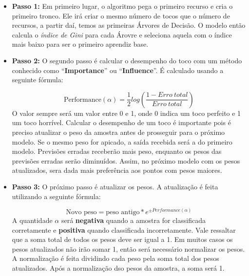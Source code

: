 \documentclass[
  letterpaper,
  DIV=11,
  numbers=noendperiod]{scrreprt}
\begin{document}
\begin{itemize}
\item
  \textbf{Passo 1:} Em primeiro lugar, o algoritmo pega o primeiro
  recurso e cria o primeiro tronco. Ele irá criar o mesmo número de
  tocos que o número de recursos, a partir daí, temos as primeiras
  Árvores de Decisão. O modelo então calcula o \emph{índice de Gini}
  para cada Árovre e seleciona aquela com o índice mais baixo para ser o
  primeiro aprendiz base.
\item
  \textbf{Passo 2:} O segundo passo é calcular o desempenho do toco com
  um método conhecido como ``\textbf{Importance}'' ou
  ``\textbf{Influence}''. É calculado usando a seguinte fórmula:

  \[
  \mbox{Performance} (\alpha) = \frac{1}{2} log(\frac{1- Erro\ total }{Erro\ total})
  \]O valor sempre será um valor entre 0 e 1, onde 0 indica um toco
  perfeito e 1 um toco horrível. Calcular o desempenho de um toco é
  importante pois é preciso atualizar o peso da amostra antes de
  prosseguir para o próximo modelo. Se o mesmo peso for apicado, a saída
  recebida será a do primeiro modelo. Previsões erradas receberão mais
  peso, enquanto os pesos das previsões erradas serão diminuídos. Assim,
  no próximo modelo com os pesos atualizados, sera dada mais preferência
  aos pontos com pesos maiores.
\item
  \textbf{Passo 3:} O próximo passo é atualizar os pesos. A atualização
  é feita utilizando a seguinte fórmula:

  \[
  \mbox{Novo peso} = \mbox{peso antigo} * e^{\pm Performance (\alpha)}
  \] A quantidade \(\alpha\) será \textbf{negativa} quando a amostra for
  classificada corretamente e \textbf{positiva} quando classificada
  incorretamente. Vale ressaltar que a soma total de todos os pesos deve
  ser igual a 1. Em muitos casos os pesos atualizados não irão somar 1,
  então será necessário normalizar os pesos. A normalização é feita
  dividindo cada peso pela soma total dos pesos atualizados. Após a
  normalização dso pesos da amostra, a soma será 1.\\


\end{itemize}
\end{document}
